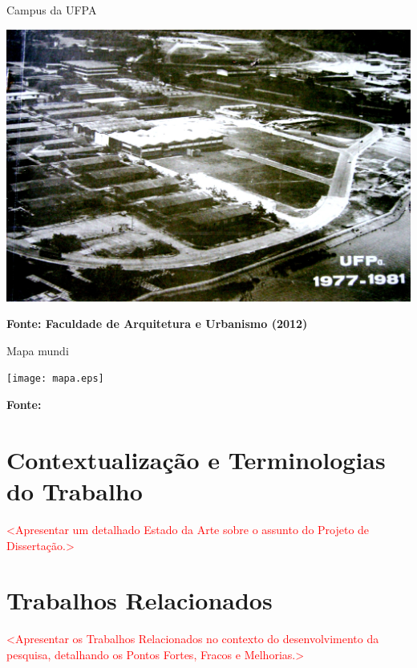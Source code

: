 \documentclass[
	12pt,				%
	openright,			%
	oneside,			%
	a4paper,			%
	chapter=TITLE,		%
	english,			%
	french,				%
	spanish,			%
	brazil				%
	]{abntex2}
\begin{document}
\begin{foto}[!htb]
	\caption{Campus da UFPA}
	\label{foto:ufpa}
	\centering
	\includegraphics[width=1\textwidth]{ufpa.jpg} \\
	\begin{small}\textbf{Fonte: Faculdade de Arquitetura e Urbanismo (2012)}\end{small}
\end{foto}

\begin{mapa}[!htb]
	\caption{Mapa mundi}
	\label{mapa}
	\centering
	\texttt{[image: mapa.eps]} \\
	\begin{small}\textbf{Fonte: }\end{small}
\end{mapa}

\chapter{Contextualização e Terminologias do Trabalho}
\label{cap:contextualizacao}

\textcolor{red}{<Apresentar um detalhado Estado da Arte sobre o assunto do Projeto de Dissertação.> }

\chapter{Trabalhos Relacionados}
\label{cap:trabalhosrelacionados}

\textcolor{red}{<Apresentar os Trabalhos Relacionados no contexto do desenvolvimento da pesquisa, detalhando os Pontos Fortes, Fracos e Melhorias.>}
\end{document}
